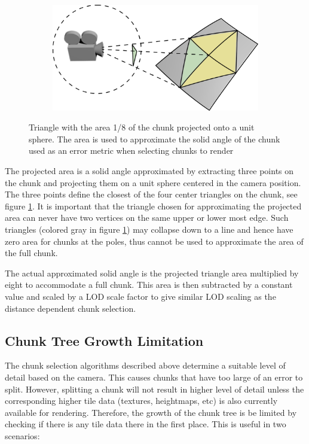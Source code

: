 \begin{figure}[htbp]
    \centering
    \begin{subfigure}[bt]{0.5\textwidth}
        \includegraphics[width=\textwidth]{figures/implementation/chunklod/projectedarea.png}
    \end{subfigure}
    \caption{Triangle with the area 1/8 of the chunk projected onto a unit sphere. The area is used to approximate the solid angle of the chunk used as an error metric when selecting chunks to render}
    \label{fig:chunkprojarea}
\end{figure}

The projected area is a solid angle approximated by extracting three points on the chunk and projecting them on a unit sphere centered in the camera position. The three points define the closest of the four center triangles on the chunk, see figure \ref{fig:chunkprojarea}. It is important that the triangle chosen for approximating the projected area can never have two vertices on the same upper or lower most edge. Such triangles (colored gray in figure \ref{fig:chunkprojarea}) may collapse down to a line and hence have zero area for chunks at the poles, thus cannot be used to approximate the area of the full chunk.

The actual approximated solid angle is the projected triangle area multiplied by eight to accommodate a full chunk. This area is then subtracted by a constant value and scaled by a LOD scale factor to give similar LOD scaling as the distance dependent chunk selection.

\subsection{Chunk Tree Growth Limitation}
The chunk selection algorithms described above determine a suitable level of detail based on the camera. This causes chunks that have too large of an error to split. However, splitting a chunk will not result in higher level of detail unless the corresponding higher tile data (textures, heightmaps, etc) is also currently available for rendering. Therefore, the growth of the chunk tree is be limited by checking if there is any tile data there in the first place. This is useful in two scenarios:

